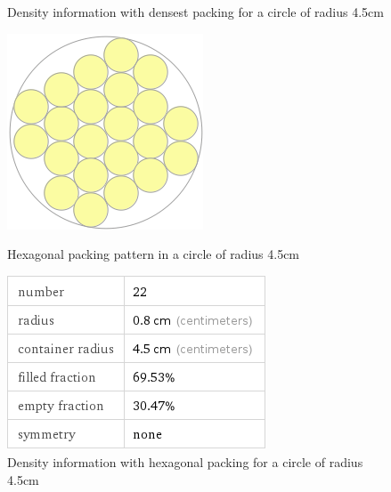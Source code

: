 \begin{figure}[ht!]
\begin{minipage}{0.4\textwidth}
    \caption{Density information with densest packing for a circle of radius 4.5cm}
    \label{fig:dense4.5_packinginfo}
    \end{minipage}
    
\end{figure}

\begin{figure}[ht!]
\centering

    \begin{minipage}{0.4\textwidth}
    \centering
    \includegraphics[width= \textwidth]{Figures/Packing/hexagonalPacking_r0.8_R4.5.png}
    \caption{Hexagonal packing pattern in a circle of radius 4.5cm}
    \label{fig:hex4.5}
    \end{minipage}\hfill
    \begin{minipage}{0.4\textwidth}
    \centering
    \includegraphics[width= \textwidth]{Figures/Packing/hexagonalPacking_r0.8_R4.5_packingPercent.png}
    \caption{Density information with hexagonal packing for a circle of radius 4.5cm}
    \label{fig:hex4.5_packinginfo}
    \end{minipage}
    
\end{figure}


